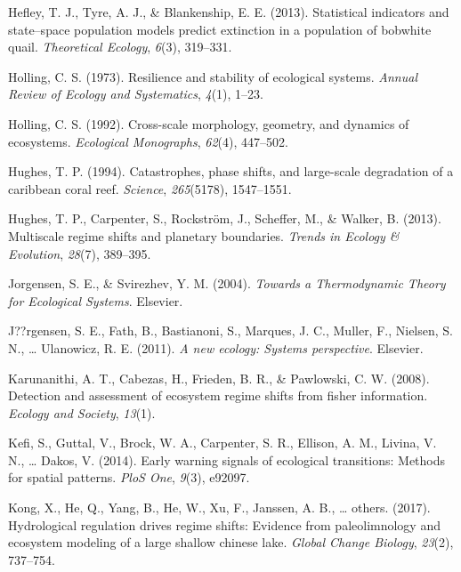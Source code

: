 \documentclass[12pt,twoside,openany]{reedthesis}
\begin{document}
\leavevmode\hypertarget{ref-hefley2013statistical}{}%
Hefley, T. J., Tyre, A. J., \& Blankenship, E. E. (2013). Statistical indicators and state--space population models predict extinction in a population of bobwhite quail. \emph{Theoretical Ecology}, \emph{6}(3), 319--331.

\leavevmode\hypertarget{ref-holling1973resilience}{}%
Holling, C. S. (1973). Resilience and stability of ecological systems. \emph{Annual Review of Ecology and Systematics}, \emph{4}(1), 1--23.

\leavevmode\hypertarget{ref-holling1992cross}{}%
Holling, C. S. (1992). Cross-scale morphology, geometry, and dynamics of ecosystems. \emph{Ecological Monographs}, \emph{62}(4), 447--502.

\leavevmode\hypertarget{ref-hughes_catastrophes_1994}{}%
Hughes, T. P. (1994). Catastrophes, phase shifts, and large-scale degradation of a caribbean coral reef. \emph{Science}, \emph{265}(5178), 1547--1551.

\leavevmode\hypertarget{ref-hughes2013multiscale}{}%
Hughes, T. P., Carpenter, S., Rockström, J., Scheffer, M., \& Walker, B. (2013). Multiscale regime shifts and planetary boundaries. \emph{Trends in Ecology \& Evolution}, \emph{28}(7), 389--395.

\leavevmode\hypertarget{ref-jorgensen_towards_2004}{}%
Jorgensen, S. E., \& Svirezhev, Y. M. (2004). \emph{Towards a Thermodynamic Theory for Ecological Systems}. Elsevier.

\leavevmode\hypertarget{ref-jorgensen_new_2011}{}%
J??rgensen, S. E., Fath, B., Bastianoni, S., Marques, J. C., Muller, F., Nielsen, S. N., \ldots{} Ulanowicz, R. E. (2011). \emph{A new ecology: Systems perspective}. Elsevier.

\leavevmode\hypertarget{ref-karunanithi_detection_2008}{}%
Karunanithi, A. T., Cabezas, H., Frieden, B. R., \& Pawlowski, C. W. (2008). Detection and assessment of ecosystem regime shifts from fisher information. \emph{Ecology and Society}, \emph{13}(1).

\leavevmode\hypertarget{ref-kefi2014early}{}%
Kefi, S., Guttal, V., Brock, W. A., Carpenter, S. R., Ellison, A. M., Livina, V. N., \ldots{} Dakos, V. (2014). Early warning signals of ecological transitions: Methods for spatial patterns. \emph{PloS One}, \emph{9}(3), e92097.

\leavevmode\hypertarget{ref-kong2017hydrological}{}%
Kong, X., He, Q., Yang, B., He, W., Xu, F., Janssen, A. B., \ldots{} others. (2017). Hydrological regulation drives regime shifts: Evidence from paleolimnology and ecosystem modeling of a large shallow chinese lake. \emph{Global Change Biology}, \emph{23}(2), 737--754.
\end{document}

